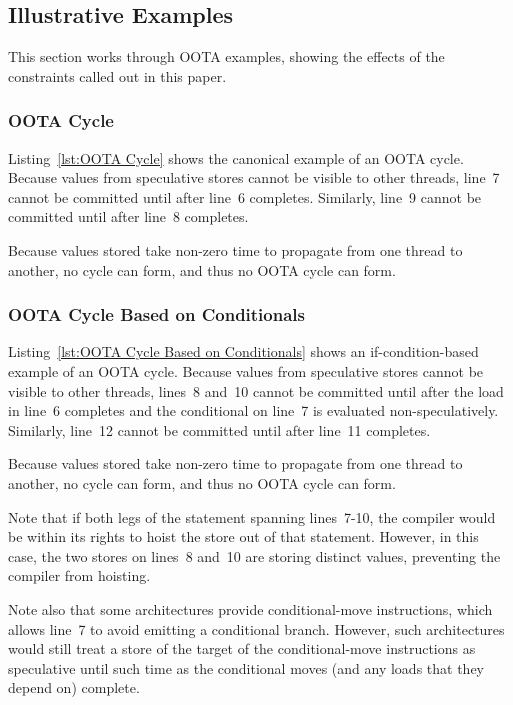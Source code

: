 \documentclass[10]{article}
\begin{document}
\subsection{Illustrative Examples}
\label{sec:Illustrative Examples}

This section works through OOTA examples, showing the effects of
the constraints called out in this paper.

\subsubsection{OOTA Cycle}
\label{sec:OOTA Cycle}

Listing~\ref{lst:OOTA Cycle}
shows the canonical example of an OOTA cycle.
Because values from speculative stores cannot be visible to other threads,
line~7 cannot be committed until after line~6 completes.
Similarly, line~9 cannot be committed until after line~8 completes.

Because values stored take non-zero time to propagate from one thread
to another, no cycle can form, and thus no OOTA cycle can form.

\subsubsection{OOTA Cycle Based on Conditionals}
\label{sec:OOTA Cycle Based on Conditionals}

Listing~\ref{lst:OOTA Cycle Based on Conditionals}
shows an if-condition-based example of an OOTA cycle.
Because values from speculative stores cannot be visible to other threads,
lines~8 and~10 cannot be committed until after the load in line~6 completes
and the conditional on line~7 is evaluated non-speculatively.
Similarly, line~12 cannot be committed until after line~11 completes.

Because values stored take non-zero time to propagate from one thread
to another, no cycle can form, and thus no OOTA cycle can form.

Note that if both legs of the  statement spanning lines~7-10,
the compiler would be within its rights to hoist the store out of
that  statement.
However, in this case, the two stores on lines~8 and~10 are storing
distinct values, preventing the compiler from hoisting.

Note also that some architectures provide conditional-move instructions,
which allows line~7 to avoid emitting a conditional branch.
However, such architectures would still treat a store of the
target of the conditional-move instructions as speculative until
such time as the conditional moves (and any loads that they depend
on) complete.
\end{document}
